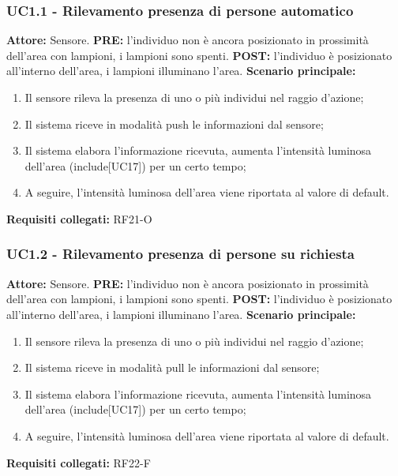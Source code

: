 \documentclass[a4paper, 12pt]{article}
\begin{document}
\subsubsection{UC1.1 - Rilevamento presenza di persone automatico}
\textbf{Attore:} Sensore.\newline
\textbf{PRE:} l'individuo non è ancora posizionato in prossimità dell'area con lampioni, i lampioni sono spenti.\newline
\textbf{POST:} l'individuo è posizionato all'interno dell'area, i lampioni illuminano l'area.\newline
\textbf{Scenario principale:}
\begin{enumerate}
    \item Il sensore rileva la presenza di uno o più individui nel raggio d'azione;
    \item Il sistema riceve in modalità push le informazioni dal sensore;
    \item Il sistema elabora l'informazione ricevuta, aumenta l'intensità luminosa dell'area (include[UC17]) per un certo tempo;
    \item A seguire, l'intensità luminosa dell'area viene riportata al valore di default.
\end{enumerate}
\textbf{Requisiti collegati:} RF21-O\newline

\subsubsection{UC1.2 - Rilevamento presenza di persone su richiesta}
\textbf{Attore:} Sensore.\newline
\textbf{PRE:} l'individuo non è ancora posizionato in prossimità dell'area con lampioni, i lampioni sono spenti.\newline
\textbf{POST:} l'individuo è posizionato all'interno dell'area, i lampioni illuminano l'area.\newline
\textbf{Scenario principale:}
\begin{enumerate}
    \item Il sensore rileva la presenza di uno o più individui nel raggio d'azione;
    \item Il sistema riceve in modalità pull le informazioni dal sensore;
    \item Il sistema elabora l'informazione ricevuta, aumenta l'intensità luminosa dell'area (include[UC17]) per un certo tempo;
    \item A seguire, l'intensità luminosa dell'area viene riportata al valore di default.
\end{enumerate}
\textbf{Requisiti collegati:} RF22-F\newline
\end{document}
